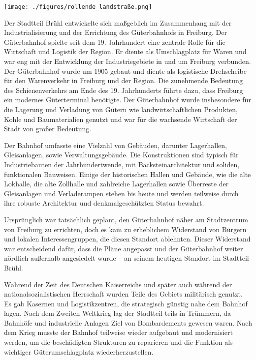 \documentclass[landscape, a4paper]{article}
\begin{document}
\hspace{0.4cm}
\begin{minipage}[t]{0.32\textwidth}
	\vspace{0cm}
	\setlength{\parskip}{0.25cm}

	\texttt{[image: ./figures/rollende\_landstraße.png]}
	\setlength{\parskip}{0.25cm}

	Der Stadtteil Brühl entwickelte sich maßgeblich im Zusammenhang mit der Industrialisierung und der Errichtung des Güterbahnhofs in Freiburg. Der Güterbahnhof spielte seit dem 19. Jahrhundert eine zentrale Rolle für die Wirtschaft und Logistik der Region. Er diente als Umschlagplatz für Waren und war eng mit der Entwicklung der Industriegebiete in und um Freiburg verbunden. Der Güterbahnhof wurde um 1905 gebaut und diente als logistische Drehscheibe für den Warenverkehr in Freiburg und der Region. Die zunehmende Bedeutung des Schienenverkehrs am Ende des 19. Jahrhunderts führte dazu, dass Freiburg ein modernes Güterterminal benötigte.
Der Güterbahnhof wurde insbesondere für die Lagerung und Verladung von Gütern wie landwirtschaftlichen Produkten, Kohle und Baumaterialien genutzt und war für die wachsende Wirtschaft der Stadt von großer Bedeutung.

Der Bahnhof umfasste eine Vielzahl von Gebäuden, darunter Lagerhallen, Gleisanlagen, sowie Verwaltungsgebäude. Die Konstruktionen sind typisch für Industriebauten der Jahrhundertwende, mit Backsteinarchitektur und soliden, funktionalen Bauweisen. Einige der historischen Hallen und Gebäude, wie die alte Lokhalle, die alte Zollhalle und zahlreiche Lagerhallen sowie Überreste der Gleisanlagen und Verladerampen stehen bis heute und werden teilweise durch ihre robuste Architektur und denkmalgeschützten Status bewahrt.

  Ursprünglich war tatsächlich geplant, den Güterbahnhof näher am Stadtzentrum von Freiburg zu errichten, doch es kam zu erheblichem Widerstand von Bürgern und lokalen Interessengruppen, die diesen Standort ablehnten. Dieser Widerstand war entscheidend dafür, dass die Pläne angepasst und der Güterbahnhof weiter nördlich außerhalb angesiedelt wurde – an seinem heutigen Standort im Stadtteil Brühl.

	Während der Zeit des Deutschen Kaiserreichs und später auch während der nationalsozialistischen Herrschaft wurden Teile des Gebiets militärisch genutzt. Es gab Kasernen und Logistikzentren, die strategisch günstig nahe dem Bahnhof lagen.
	Nach dem Zweiten Weltkrieg lag der Stadtteil teils in Trümmern, da Bahnhöfe und industrielle Anlagen Ziel von Bombardements gewesen waren. Nach dem Krieg musste der Bahnhof teilweise wieder aufgebaut und modernisiert werden, um die beschädigten Strukturen zu reparieren und die Funktion als wichtiger Güterumschlagplatz wiederherzustellen.


\end{minipage}
\end{document}
